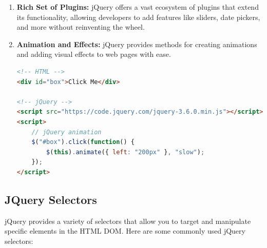 \documentclass[11pt]{article}
\begin{document}
\begin{enumerate}
    \item \textbf{Rich Set of Plugins:} jQuery offers a vast ecosystem of plugins that extend its functionality, allowing developers to add features like sliders, date pickers, and more without reinventing the wheel.

    \item \textbf{Animation and Effects:} jQuery provides methods for creating animations and adding visual effects to web pages with ease.

          \begin{lstlisting}[language=HTML, caption=Example: Animation]
<!-- HTML -->
<div id="box">Click Me</div>

<!-- jQuery -->
<script src="https://code.jquery.com/jquery-3.6.0.min.js"></script>
<script>
    // jQuery animation
    $("#box").click(function() {
        $(this).animate({ left: "200px" }, "slow");
    });
</script>
\end{lstlisting}

\end{enumerate}

\subsection{JQuery Selectors}

jQuery provides a variety of selectors that allow you to target and manipulate specific elements in the HTML DOM. Here are some commonly used jQuery selectors:
\end{document}
